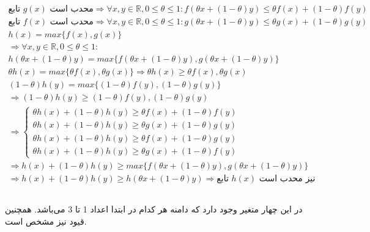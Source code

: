 \documentclass{university}
\begin{document}
\subsubsection{}
\begin{gather*}
    \text{تابع $g(x)$ محدب است} \Rightarrow \forall x,y \in \mathbb{R}, 0 \leq \theta \leq 1 :
    f(\theta x + (1-\theta) y) \leq \theta f(x) + (1 - \theta) f(y)\\
    \text{تابع $f(x)$ محدب است} \Rightarrow \forall x,y \in \mathbb{R}, 0 \leq \theta \leq 1 :
    g(\theta x + (1-\theta) y) \leq \theta g(x) + (1 - \theta) g(y)\\
    h(x) = max\{f(x), g(x)\} \\ 
    \Rightarrow \forall x,y \in \mathbb{R}, 0 \leq \theta \leq 1 : \\
    h(\theta x + (1-\theta) y) = max\{f(\theta x + (1-\theta) y), g(\theta x + (1-\theta) y)\} \\
    \theta h(x) = max\{\theta f(x), \theta g(x)\} 
    \Rightarrow \theta h(x) \geq \theta f(x), \theta g(x) \\
    (1 - \theta) h(y) = max\{(1 - \theta) f(y), (1 - \theta) g(y)\} \\
    \Rightarrow (1 - \theta) h(y) \geq (1 - \theta) f(y), (1 - \theta) g(y) \\
    \Rightarrow
    \begin{cases}
        \theta h(x) + (1 - \theta) h(y) \geq \theta f(x) + (1 - \theta) f(y) \\
        \theta h(x) + (1 - \theta) h(y) \geq \theta g(x) + (1 - \theta) g(y) \\
        \theta h(x) + (1 - \theta) h(y) \geq \theta f(x) + (1 - \theta) g(y) \\
        \theta h(x) + (1 - \theta) h(y) \geq \theta g(x) + (1 - \theta) f(y)
    \end{cases} \\
    \Rightarrow h(x) + (1 - \theta) h(y) \geq max\{f(\theta x + (1-\theta) y), g(\theta x + (1-\theta) y)\} \\
    \Rightarrow h(x) + (1 - \theta) h(y) \geq h(\theta x + (1-\theta) y) 
    \Rightarrow \text{تابع $h(x)$ نیز محدب است}
\end{gather*}

\subsection{}
در این 
چهار متغیر وجود دارد که دامنه هر کدام در ابتدا اعداد 1 تا 3 می‌باشد. همچنین قیود نیز مشخص است. 
\end{document}
